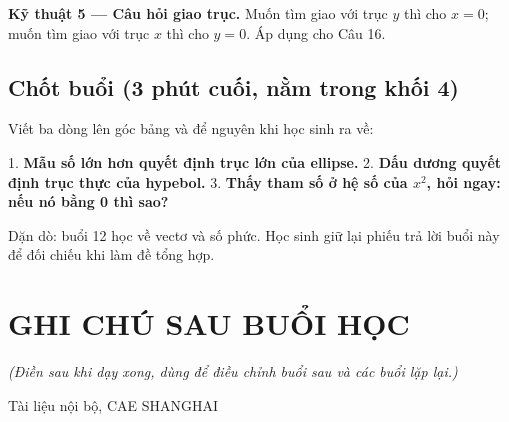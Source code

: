 \documentclass[11pt, a4paper]{article}
\begin{document}
\textbf{Kỹ thuật 5 — Câu hỏi giao trục.} Muốn tìm giao với trục $y$ thì cho $x = 0$; muốn tìm giao với trục $x$ thì cho $y = 0$. Áp dụng cho Câu 16.

\subsection{Chốt buổi (3 phút cuối, nằm trong khối 4)}

Viết ba dòng lên góc bảng và để nguyên khi học sinh ra về:

1. \textbf{Mẫu số lớn hơn quyết định trục lớn của ellipse.}
2. \textbf{Dấu dương quyết định trục thực của hypebol.}
3. \textbf{Thấy tham số ở hệ số của $x^2$, hỏi ngay: nếu nó bằng 0 thì sao?}

Dặn dò: buổi 12 học về vectơ và số phức. Học sinh giữ lại phiếu trả lời buổi này để đối chiếu khi làm đề tổng hợp.

\section{GHI CHÚ SAU BUỔI HỌC}

\emph{(Điền sau khi dạy xong, dùng để điều chỉnh buổi sau và các buổi lặp lại.)}

\vspace{0.8cm}
\begin{center}
{\footnotesize\color{cae_blue} Tài liệu nội bộ, CAE SHANGHAI}
\end{center}
\end{document}

